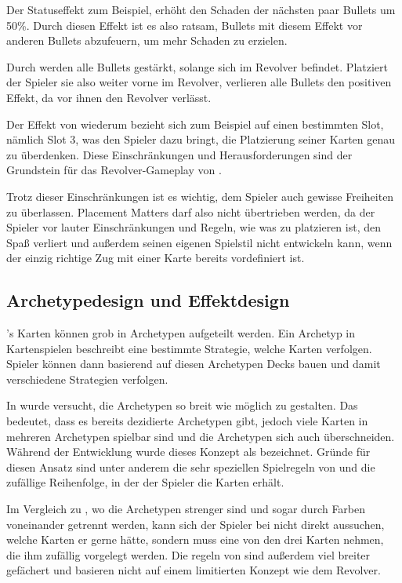 Der Statuseffekt  zum Beispiel, erhöht den Schaden der nächsten paar Bullets um 50\%.
Durch diesen Effekt ist es also ratsam, Bullets mit diesem Effekt vor anderen Bullets abzufeuern, um mehr Schaden zu erzielen.


Durch  werden alle Bullets gestärkt, solange sich  im Revolver befindet. Platziert der Spieler sie also
weiter vorne im Revolver, verlieren alle Bullets den positiven Effekt, da  vor ihnen den Revolver verlässt.


Der Effekt von  wiederum bezieht sich zum Beispiel auf einen bestimmten Slot, nämlich Slot 3,
was den Spieler dazu bringt, die Platzierung seiner Karten genau zu überdenken. Diese Einschränkungen und Herausforderungen
sind der Grundstein für das Revolver-Gameplay von \FF.


Trotz dieser Einschränkungen ist es wichtig, dem Spieler auch gewisse Freiheiten zu überlassen. Placement Matters darf
also nicht übertrieben werden, da der Spieler vor lauter Einschränkungen und Regeln, wie was zu platzieren ist, den Spaß
verliert und außerdem seinen eigenen Spielstil nicht entwickeln kann, wenn der einzig richtige Zug mit einer Karte bereits vordefiniert ist.



\subsection{Archetypedesign und Effektdesign}\label{subsec:placementMatters}

\FF's Karten können grob in Archetypen aufgeteilt werden. Ein Archetyp in Kartenspielen beschreibt eine bestimmte Strategie, welche Karten verfolgen.
Spieler können dann basierend auf diesen Archetypen Decks bauen und damit verschiedene Strategien verfolgen.


In \FF wurde versucht, die Archetypen so breit wie möglich zu gestalten. Das bedeutet, dass es bereits dezidierte Archetypen gibt,
jedoch viele Karten in mehreren Archetypen spielbar sind und die Archetypen sich auch überschneiden.
Während der Entwicklung wurde dieses Konzept als  bezeichnet. Gründe für diesen Ansatz sind unter anderem
die sehr speziellen Spielregeln von \FF und die zufällige Reihenfolge, in der der Spieler die Karten erhält.


Im Vergleich zu , wo die Archetypen strenger sind und sogar durch Farben voneinander getrennt werden,
kann sich der Spieler bei \FF nicht direkt aussuchen, welche Karten er gerne hätte, sondern muss eine von den drei Karten nehmen,
die ihm zufällig vorgelegt werden. Die regeln von  sind außerdem viel breiter gefächert und basieren nicht auf einem limitierten
Konzept wie dem Revolver. 


